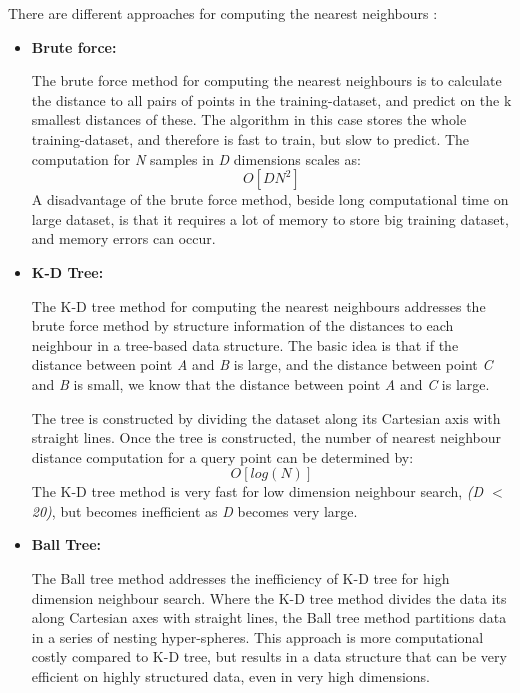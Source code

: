 \documentclass[english, a4paper]{report}
\begin{document}
{{{{                There are different approaches for computing the nearest neighbours \cite{nearestneighbourAlgorithm}:
                
                \begin{itemize}
                    \item \textbf{Brute force:} \par The brute force method for computing the nearest neighbours is to calculate the distance to all pairs of points in the training-dataset, and predict on the k smallest distances of these. The algorithm in this case stores the whole training-dataset, and therefore is fast to train, but slow to predict. The computation for \textit{N} samples in \textit{D} dimensions scales as:
                    \begin{equation}
                        O[DN^2]
                    \end{equation}
                    A disadvantage of the brute force method, beside long computational time on large dataset, is that it requires a lot of memory to store big training dataset, and memory errors can occur.
                    \item \textbf{K-D Tree:} \par The K-D tree method for computing the nearest neighbours addresses the brute force method by structure information of the distances to each neighbour in a tree-based data structure. The basic idea is that if the distance between point \textit{A} and \textit{B} is large, and the distance between point \textit{C} and \textit{B} is small, we know that the distance between point \textit{A} and \textit{C} is large. 
                    \par 
                    The tree is constructed by dividing the dataset along its Cartesian axis with straight lines. Once the tree is constructed, the number of nearest neighbour distance computation for a query point can be determined by:
                    \begin{equation}
                        O[log(N)]
                    \end{equation}
                    The K-D tree method is very fast for low dimension neighbour search, \textit{(D $<$ 20)}, but becomes inefficient as \textit{D} becomes very large.
                    \item \textbf{Ball Tree:} \par The Ball tree method addresses the inefficiency of K-D tree for high dimension neighbour search. Where the K-D tree method divides the data its along Cartesian axes with straight lines, the Ball tree method partitions data in a series of nesting hyper-spheres. This approach is more computational costly compared to K-D tree, but results in a data structure that can be very efficient on highly structured data, even in very high dimensions.
                \end{itemize}
            }
        }
        
}}
\end{document}
